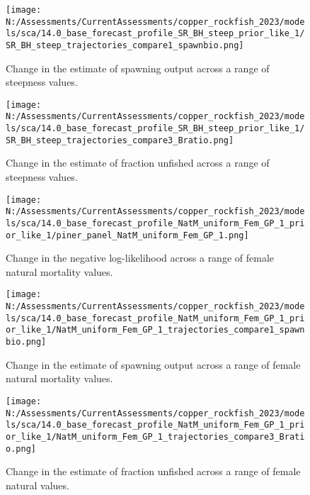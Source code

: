 \documentclass[11pt,
  english,
  letterpaper,
]{article}
\begin{document}
\pagebreak

\begin{figure}
\centering
\texttt{[image: N:/Assessments/CurrentAssessments/copper\_rockfish\_2023/models/sca/14.0\_base\_forecast\_profile\_SR\_BH\_steep\_prior\_like\_1/SR\_BH\_steep\_trajectories\_compare1\_spawnbio.png]}
\caption{Change in the estimate of spawning output across a range of steepness values.\label{fig:h-ssb}}
\end{figure}

\pagebreak

\begin{figure}
\centering
\texttt{[image: N:/Assessments/CurrentAssessments/copper\_rockfish\_2023/models/sca/14.0\_base\_forecast\_profile\_SR\_BH\_steep\_prior\_like\_1/SR\_BH\_steep\_trajectories\_compare3\_Bratio.png]}
\caption{Change in the estimate of fraction unfished across a range of steepness values.\label{fig:h-depl}}
\end{figure}

\pagebreak

\begin{figure}
\centering
\texttt{[image: N:/Assessments/CurrentAssessments/copper\_rockfish\_2023/models/sca/14.0\_base\_forecast\_profile\_NatM\_uniform\_Fem\_GP\_1\_prior\_like\_1/piner\_panel\_NatM\_uniform\_Fem\_GP\_1.png]}
\caption{Change in the negative log-likelihood across a range of female natural mortality values.\label{fig:m-profile}}
\end{figure}

\pagebreak

\begin{figure}
\centering
\texttt{[image: N:/Assessments/CurrentAssessments/copper\_rockfish\_2023/models/sca/14.0\_base\_forecast\_profile\_NatM\_uniform\_Fem\_GP\_1\_prior\_like\_1/NatM\_uniform\_Fem\_GP\_1\_trajectories\_compare1\_spawnbio.png]}
\caption{Change in the estimate of spawning output across a range of female natural mortality values.\label{fig:m-ssb}}
\end{figure}

\pagebreak

\begin{figure}
\centering
\texttt{[image: N:/Assessments/CurrentAssessments/copper\_rockfish\_2023/models/sca/14.0\_base\_forecast\_profile\_NatM\_uniform\_Fem\_GP\_1\_prior\_like\_1/NatM\_uniform\_Fem\_GP\_1\_trajectories\_compare3\_Bratio.png]}
\caption{Change in the estimate of fraction unfished across a range of female natural values.\label{fig:m-depl}}
\end{figure}
\end{document}
